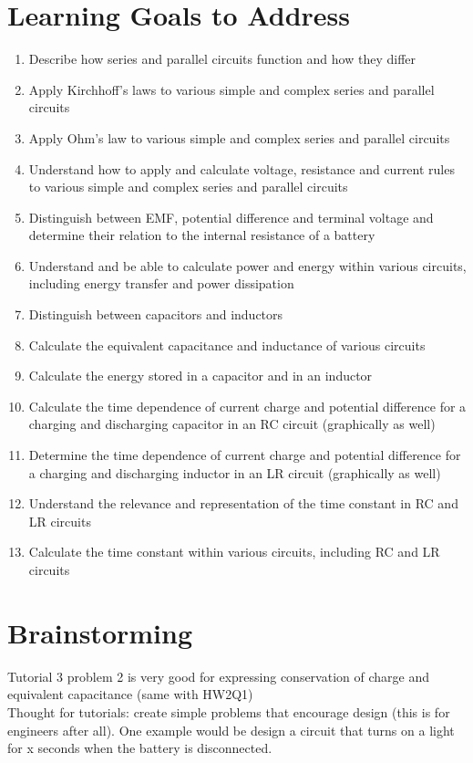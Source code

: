 \documentclass[11pt, fleqn]{article}
\begin{document}
\section*{Learning Goals to Address}
\begin{enumerate}
    \item Describe how series and parallel circuits function and how they differ 
    \item Apply Kirchhoff’s laws to various simple and complex series and parallel circuits
    \item Apply Ohm's law to various simple and complex series and parallel circuits
    \item Understand how to apply and calculate voltage, resistance and current rules to various simple and complex series and parallel circuits 
    \item Distinguish between EMF, potential difference and terminal voltage and determine their relation to the internal resistance of a battery 
    \item Understand and be able to calculate power and energy within various circuits, including energy transfer and power dissipation 
    \item Distinguish between capacitors and inductors 
    \item Calculate the equivalent capacitance and inductance of various circuits 
    \item Calculate the energy stored in a capacitor and in an inductor 
    \item Calculate the time dependence of current charge and potential difference for a charging and discharging capacitor in an RC circuit (graphically as well)
    \item Determine the time dependence of current charge and potential difference for a charging and discharging inductor in an LR circuit (graphically as well)
    \item Understand the relevance and representation of the time constant in RC and LR circuits
    \item Calculate the time constant within various circuits, including RC and LR circuits
\end{enumerate}

\section*{Brainstorming}
Tutorial 3 problem 2 is very good for expressing conservation of charge and equivalent capacitance (same with HW2Q1)\\
Thought for tutorials: create simple problems that encourage design (this is for engineers after all). One example would be design a circuit that turns on a light for x seconds when the battery is disconnected.
\end{document}
